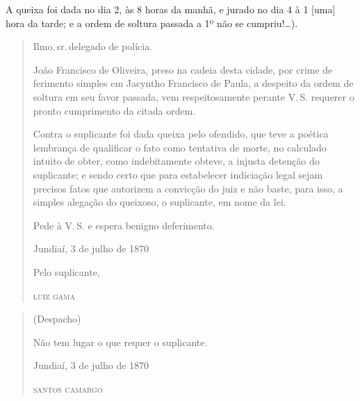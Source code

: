 A queixa foi dada no dia 2, às 8 horas da manhã, e jurado no dia 4 à 1
{[}uma{]} hora da tarde; e a ordem de soltura passada a 1º não se
cumpriu!\ldots{}).

\asterisc{}

\begin{quote}
Ilmo.\,sr.\,delegado de polícia.

João Francisco de Oliveira, preso na cadeia desta cidade, por crime de
ferimento simples em Jacyntho Francisco de Paula, a despeito da ordem de
soltura em seu favor passada, vem respeitosamente perante V.\,S. requerer
o pronto cumprimento da citada ordem.

Contra o suplicante foi dada queixa pelo ofendido, que teve a poética
lembrança de qualificar o fato como tentativa de morte, no calculado
intuito de obter, como indebitamente obteve, a injusta detenção do
suplicante; e sendo certo que para estabelecer indiciação legal sejam
precisos fatos que autorizem a convicção do juiz e não baste, para isso,
a simples alegação do queixoso, o suplicante, em nome da lei.

Pede à V.\,S. e espera benigno deferimento.

\begin{flushright}
Jundiaí, 3 de julho de 1870

Pelo suplicante,

\textsc{luiz gama}
\end{flushright}
\end{quote}

\begin{quote}
(Despacho)

Não tem lugar o que requer o suplicante.

\begin{flushright}
Jundiaí, 3 de julho de 1870

\textsc{santos camargo}
\end{flushright}
\end{quote}

\asterisc{}

